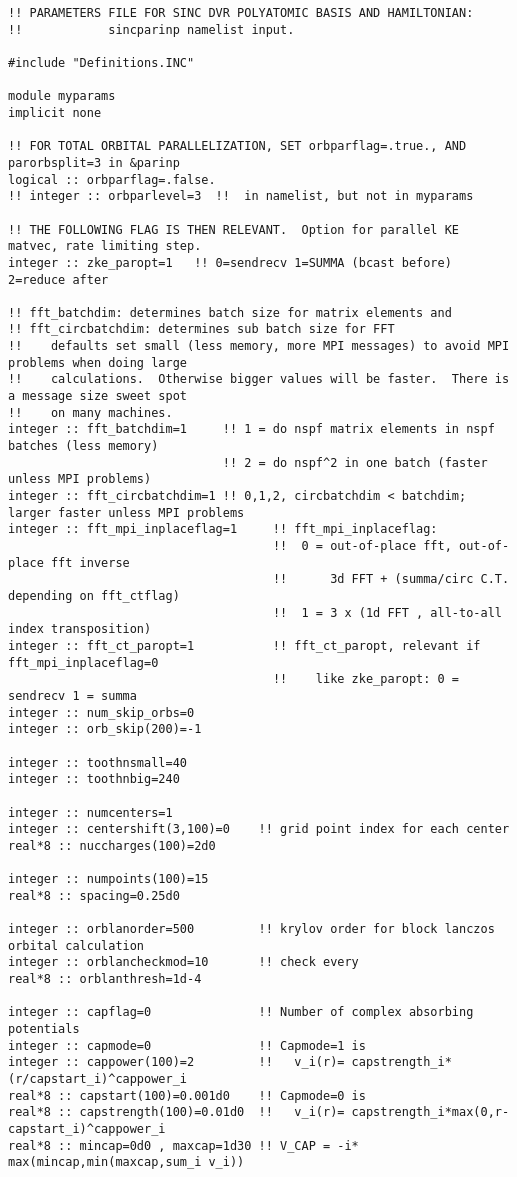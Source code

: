 \begin{verbatim}
!! PARAMETERS FILE FOR SINC DVR POLYATOMIC BASIS AND HAMILTONIAN:
!!            sincparinp namelist input.

#include "Definitions.INC"

module myparams
implicit none

!! FOR TOTAL ORBITAL PARALLELIZATION, SET orbparflag=.true., AND parorbsplit=3 in &parinp
logical :: orbparflag=.false.
!! integer :: orbparlevel=3  !!  in namelist, but not in myparams

!! THE FOLLOWING FLAG IS THEN RELEVANT.  Option for parallel KE matvec, rate limiting step.
integer :: zke_paropt=1   !! 0=sendrecv 1=SUMMA (bcast before) 2=reduce after

!! fft_batchdim: determines batch size for matrix elements and 
!! fft_circbatchdim: determines sub batch size for FFT 
!!    defaults set small (less memory, more MPI messages) to avoid MPI problems when doing large 
!!    calculations.  Otherwise bigger values will be faster.  There is a message size sweet spot
!!    on many machines.
integer :: fft_batchdim=1     !! 1 = do nspf matrix elements in nspf batches (less memory)
                              !! 2 = do nspf^2 in one batch (faster unless MPI problems)
integer :: fft_circbatchdim=1 !! 0,1,2, circbatchdim < batchdim; larger faster unless MPI problems
integer :: fft_mpi_inplaceflag=1     !! fft_mpi_inplaceflag:
                                     !!  0 = out-of-place fft, out-of-place fft inverse
                                     !!      3d FFT + (summa/circ C.T. depending on fft_ctflag)
                                     !!  1 = 3 x (1d FFT , all-to-all index transposition)
integer :: fft_ct_paropt=1           !! fft_ct_paropt, relevant if fft_mpi_inplaceflag=0
                                     !!    like zke_paropt: 0 = sendrecv 1 = summa
integer :: num_skip_orbs=0
integer :: orb_skip(200)=-1

integer :: toothnsmall=40
integer :: toothnbig=240

integer :: numcenters=1
integer :: centershift(3,100)=0    !! grid point index for each center
real*8 :: nuccharges(100)=2d0

integer :: numpoints(100)=15
real*8 :: spacing=0.25d0

integer :: orblanorder=500         !! krylov order for block lanczos orbital calculation
integer :: orblancheckmod=10       !! check every
real*8 :: orblanthresh=1d-4

integer :: capflag=0               !! Number of complex absorbing potentials
integer :: capmode=0               !! Capmode=1 is 
integer :: cappower(100)=2         !!   v_i(r)= capstrength_i*(r/capstart_i)^cappower_i
real*8 :: capstart(100)=0.001d0    !! Capmode=0 is    
real*8 :: capstrength(100)=0.01d0  !!   v_i(r)= capstrength_i*max(0,r-capstart_i)^cappower_i
real*8 :: mincap=0d0 , maxcap=1d30 !! V_CAP = -i* max(mincap,min(maxcap,sum_i v_i))


\end{verbatim}
